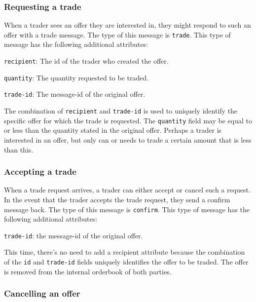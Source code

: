 \subsubsection{Requesting a trade}
When a trader sees an offer they are interested in, they might respond to such an offer with a trade message.
The type of this message is \texttt{trade}.
This type of message has the following additional attributes:

\begin{myitemize}
\item \texttt{recipient}: The id of the trader who created the offer.
\item \texttt{quantity}: The quantity requested to be traded.
\item \texttt{trade-id}: The message-id of the original offer.
\end{myitemize}

The combination of \texttt{recipient} and \texttt{trade-id} is used to uniquely identify the specific offer for which the trade is requested.
The \texttt{quantity} field may be equal to or less than the quantity stated in the original offer.
Perhaps a trader is interested in an offer, but only can or needs to trade a certain amount that is less than this.

\subsubsection{Accepting a trade}

When a trade request arrives, a trader can either accept or cancel such a request.
In the event that the trader accepts the trade request, they send a confirm message back.
The type of this message is \texttt{confirm}.
This type of message has the following additional attributes:

\begin{myitemize}
\item \texttt{trade-id}: the message-id of the original offer.
\end{myitemize}

This time, there's no need to add a recipient attribute because the combination of the \texttt{id} and \texttt{trade-id} fields uniquely identifies the offer to be traded.
The offer is removed from the internal orderbook of both parties.

\subsubsection{Cancelling an offer}

